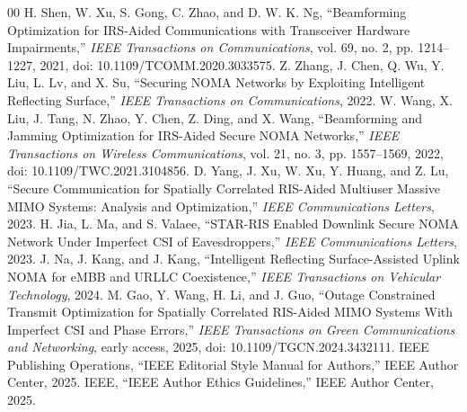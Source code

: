 \documentclass[journal]{IEEEtran}
\begin{document}
\begin{thebibliography}{00}
 H. Shen, W. Xu, S. Gong, C. Zhao, and D. W. K. Ng, ``Beamforming Optimization for IRS-Aided Communications with Transceiver Hardware Impairments,'' \emph{IEEE Transactions on Communications}, vol. 69, no. 2, pp. 1214--1227, 2021, doi: 10.1109/TCOMM.2020.3033575.
 Z. Zhang, J. Chen, Q. Wu, Y. Liu, L. Lv, and X. Su, ``Securing NOMA Networks by Exploiting Intelligent Reflecting Surface,'' \emph{IEEE Transactions on Communications}, 2022.
 W. Wang, X. Liu, J. Tang, N. Zhao, Y. Chen, Z. Ding, and X. Wang, ``Beamforming and Jamming Optimization for IRS-Aided Secure NOMA Networks,'' \emph{IEEE Transactions on Wireless Communications}, vol. 21, no. 3, pp. 1557--1569, 2022, doi: 10.1109/TWC.2021.3104856.
 D. Yang, J. Xu, W. Xu, Y. Huang, and Z. Lu, ``Secure Communication for Spatially Correlated RIS-Aided Multiuser Massive MIMO Systems: Analysis and Optimization,'' \emph{IEEE Communications Letters}, 2023.
 H. Jia, L. Ma, and S. Valaee, ``STAR-RIS Enabled Downlink Secure NOMA Network Under Imperfect CSI of Eavesdroppers,'' \emph{IEEE Communications Letters}, 2023.
 J. Na, J. Kang, and J. Kang, ``Intelligent Reflecting Surface-Assisted Uplink NOMA for eMBB and URLLC Coexistence,'' \emph{IEEE Transactions on Vehicular Technology}, 2024.
 M. Gao, Y. Wang, H. Li, and J. Guo, ``Outage Constrained Transmit Optimization for Spatially Correlated RIS-Aided MIMO Systems With Imperfect CSI and Phase Errors,'' \emph{IEEE Transactions on Green Communications and Networking}, early access, 2025, doi: 10.1109/TGCN.2024.3432111.
 IEEE Publishing Operations, ``IEEE Editorial Style Manual for Authors,'' IEEE Author Center, 2025.
 IEEE, ``IEEE Author Ethics Guidelines,'' IEEE Author Center, 2025.
\end{thebibliography}
\end{document}
